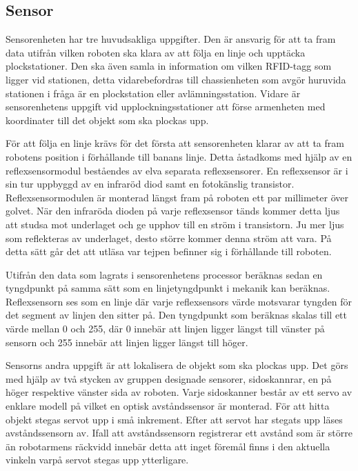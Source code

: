 

\subsection{Sensor}

Sensorenheten har tre huvudsakliga uppgifter. Den är ansvarig för att ta fram data utifrån vilken roboten ska klara av att följa en linje och upptäcka plockstationer. Den ska även samla in information om vilken RFID-tagg som ligger vid stationen, detta vidarebefordras till chassienheten som avgör huruvida stationen i fråga är en plockstation eller avlämningsstation. Vidare är sensorenhetens uppgift vid upplockningsstationer att förse armenheten med koordinater till det objekt som ska plockas upp.

För att följa en linje krävs för det första att sensorenheten klarar av att ta fram robotens position i förhållande till banans linje. Detta åstadkoms med hjälp av en reflexsensormodul beståendes av elva separata reflexsensorer. En reflexsensor är i sin tur uppbyggd av en infraröd diod samt en fotokänslig transistor. Reflexsensormodulen är monterad längst fram på roboten ett par millimeter över golvet. När den infraröda dioden på varje reflexsensor tänds kommer detta ljus att studsa mot underlaget och ge upphov till en ström i transistorn. Ju mer ljus som reflekteras av underlaget, desto större kommer denna ström att vara. På detta sätt går det att utläsa var tejpen befinner sig i förhållande till roboten.

Utifrån den data som lagrats i sensorenhetens processor beräknas sedan en tyngdpunkt på samma sätt som en linjetyngdpunkt i mekanik kan beräknas. Reflexsensorn ses som en linje där varje reflexsensors värde motsvarar tyngden för det segment av linjen den sitter på. Den tyngdpunkt som beräknas skalas till ett värde mellan 0 och 255, där 0 innebär att linjen ligger längst till vänster på sensorn och 255 innebär att linjen ligger längst till höger. 

Sensorns andra uppgift är att lokalisera de objekt som ska plockas upp. Det görs med hjälp av två stycken av gruppen designade sensorer, sidoskannrar, en på höger respektive vänster sida av roboten. Varje sidoskanner består av ett servo av enklare modell på vilket en optisk avståndssensor är monterad. För att hitta objekt stegas servot upp i små inkrement. Efter att servot har stegats upp läses avståndssensorn av. Ifall att avståndssensorn registrerar ett avstånd som är större än robotarmens räckvidd innebär detta att inget föremål finns i den aktuella vinkeln varpå servot stegas upp ytterligare.

